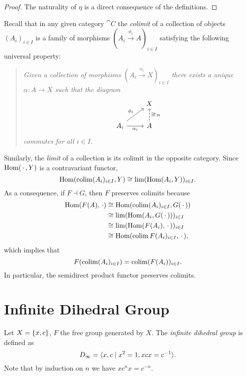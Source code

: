 \begin{proof}
    The naturality of $\eta$ is a direct consequence of the definitions.
\end{proof}

\begin{rem}
    Recall that in any given category $\cat C$ the \textsl{colimit} of a collection of objects $(A_i)_{i\in I}$ is a family of morphisms $(A_i\stackrel{\phi_i}\to A)_{i\in I}$ satisfying the following universal property: 
    \begin{quote}\it
        Given a collection of morphisms\/ $(A_i\stackrel{\alpha_i}\to X)_{i\in I}$ there exists a unique\/ $\alpha\colon A\to X$ such that the diagram
        $$
            \begin{tikzcd}
                    &X\\
                A_i
                        \arrow[ru,"\phi_i"]
                        \arrow[r,"\alpha_i"']
                    &A
                        \arrow[u,"{\exists!\,\alpha}"',dashed]
            \end{tikzcd}
        $$
        commutes for all\/ $i\in I$.
    \end{quote}
    Similarly, the \textsl{limit} of a collection is its colimit in the opposite category. Since ${\rm Hom}(\,\cdot\,,Y)$ is a contravariant functor,
    $$
        {\rm Hom}(\operatorname{colim}(A_i)_{i\in I},Y)\cong\lim({\rm Hom}(A_i,Y))_{i\in I}.
    $$
    As a consequence, if $F\dashv G$, then $F$ preserves colimits because
    \begin{align*}
        {\rm Hom}(F(A), \,\cdot) &\cong {\rm Hom}(\operatorname{colim}(A_i)_{i\in I}, G(\,\cdot\,))\\
            &\cong\lim({\rm Hom}(A_i, G(\,\cdot\,)))_{i\in I}\\
            &\cong\lim({\rm Hom}(F(A_i), \,\cdot\,))_{i\in I}\\
            &\cong{\rm Hom}(\operatorname{colim}F(A_i)_{i\in I},\,\cdot\,),
    \end{align*}
    which implies that
    $$
        F(\operatorname{colim}(A_i)_{i\in I})=\operatorname{colim}(F(A_i))_{i\in I}.
    $$
    In particular, the semidirect product functor preserves colimits.
\end{rem}

\section{Infinite Dihedral Group}

\begin{defn}
    Let $X=\{x,c\}$, $F$ the free group generated by $X$. The \textsl{infinite dihedral group} is defined as
    $$
        D_\infty=\langle x,c\mid x^2=1, xcx=c^{-1}\rangle.
    $$
    Note that by induction on $n$ we have $xc^nx=c^{-n}$.
\end{defn}



